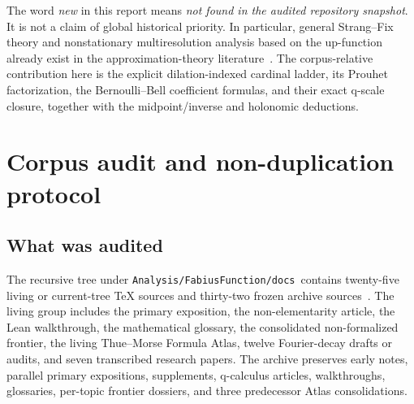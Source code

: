\documentclass[11pt,oneside]{article}
\theoremstyle{definition}
\theoremstyle{remark}
\newcommand{\Up}{\operatorname{up}}
\newcommand{\ord}{\operatorname{ord}}
\newcommand{\repo}{\nolinkurl{Analysis/FabiusFunction/docs}}
\begin{document}
\begin{abstract}
Third, two independent obstructions exclude holonomicity.  The midpoint identity propagates nonanalyticity backward through the dyadic tent map, proving that $F$ is nonanalytic at every dyadic rational; the same mechanism gives dense nonanalytic sets for $F^{-1}$ and $\Up$.  Hence none is locally D-finite on any open interval.  Independently, the unbounded multiplicities
$\ord_m\widehat\Up=1+\nu_2(|m|)$ rule out a polynomial-coefficient differential equation for the entire Fourier transform.  This implies non-D-finiteness of the moment generating functions, non-P-recursiveness of the moment sequences, and non-P-recursiveness of every fixed-$x$ Appell coefficient sequence.  Symbolic and high-precision numerical experiments accompany the proofs, and the fully commented Python program is included in the archive.
\end{abstract}

\begin{tcolorbox}[colback=lightorange,colframe=conjorange,title=Priority and novelty disclaimer,fonttitle=\bfseries]
The word \emph{new} in this report means \emph{not found in the audited repository snapshot}.  It is not a claim of global historical priority.  In particular, general Strang--Fix theory and nonstationary multiresolution analysis based on the up-function already exist in the approximation-theory literature~\cite{strangFix,dynRon,liShen}.  The corpus-relative contribution here is the explicit dilation-indexed cardinal ladder, its Prouhet factorization, the Bernoulli--Bell coefficient formulas, and their exact q-scale closure, together with the midpoint/inverse and holonomic deductions.
\end{tcolorbox}

\tableofcontents
\newpage

\section{Corpus audit and non-duplication protocol}
\label{sec:audit}

\subsection{What was audited}
The recursive tree under \repo\ contains twenty-five living or current-tree TeX sources and thirty-two frozen archive sources~\cite{proveit,primary,frontier,atlas}.  The living group includes the primary exposition, the non-elementarity article, the Lean walkthrough, the mathematical glossary, the consolidated non-formalized frontier, the living Thue--Morse Formula Atlas, twelve Fourier-decay drafts or audits, and seven transcribed research papers.  The archive preserves early notes, parallel primary expositions, supplements, q-calculus articles, walkthroughs, glossaries, per-topic frontier dossiers, and three predecessor Atlas consolidations.
\end{document}
